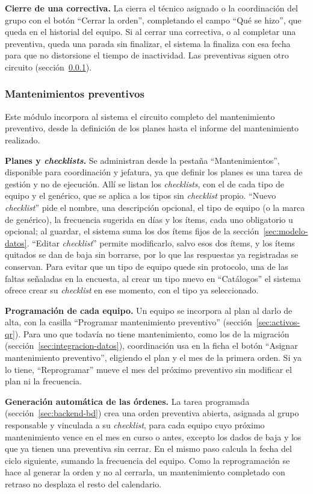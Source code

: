\documentclass[10pt]{article}
\begin{document}
\noindent \textbf{Cierre de una correctiva.} La cierra el técnico asignado o la coordinación del grupo con el botón “Cerrar la orden”, completando el campo “Qué se hizo”, que queda en el historial del equipo.  Si al cerrar una correctiva, o al completar una preventiva, queda una parada sin finalizar, el sistema la finaliza con esa fecha para que no distorsione el tiempo de inactividad. Las preventivas siguen otro circuito (sección~\ref{sec:mantenimiento-preventivo}).
\subsubsection{Mantenimientos preventivos}
\label{sec:mantenimiento-preventivo}
Este módulo incorpora al sistema el circuito completo del mantenimiento preventivo, desde la definición de los planes hasta el informe del mantenimiento realizado.

\textbf{Planes y \textit{checklists}.} Se administran desde la pestaña “Mantenimientos”, disponible para coordinación y jefatura, ya que definir los planes es una tarea de gestión y no de ejecución. Allí se listan los \textit{checklists}, con el de cada tipo de equipo y el genérico, que se aplica a los tipos sin \textit{checklist} propio. “Nuevo \textit{checklist}” pide el nombre, una descripción opcional, el tipo de equipo (o la marca de genérico), la frecuencia sugerida en días y los ítems, cada uno obligatorio u opcional; al guardar, el sistema suma los dos ítems fijos de la sección~\ref{sec:modelo-datos}. “Editar \textit{checklist}” permite modificarlo, salvo esos dos ítems, y los ítems quitados se dan de baja sin borrarse, por lo que las respuestas ya registradas se conservan. Para evitar que un tipo de equipo quede sin protocolo, una de las faltas señaladas en la encuesta, al crear un tipo nuevo en “Catálogos” el sistema ofrece crear su \textit{checklist} en ese momento, con el tipo ya seleccionado.

\textbf{Programación de cada equipo.} Un equipo se incorpora al plan al darlo de alta, con la casilla “Programar mantenimiento preventivo” (sección~\ref{sec:activos-qr}). Para uno que todavía no tiene mantenimiento, como los de la migración (sección~\ref{sec:integracion-datos}), coordinación usa en la ficha el botón “Asignar mantenimiento preventivo”, eligiendo el plan y el mes de la primera orden. Si ya lo tiene, “Reprogramar” mueve el mes del próximo preventivo sin modificar el plan ni la frecuencia.

\textbf{Generación automática de las órdenes.} La tarea programada (sección~\ref{sec:backend-bd}) crea una orden preventiva abierta, asignada al grupo responsable y vinculada a su \textit{checklist}, para cada equipo cuyo próximo mantenimiento vence en el mes en curso o antes, excepto los dados de baja y los que ya tienen una preventiva sin cerrar. En el mismo paso calcula la fecha del ciclo siguiente, sumando la frecuencia del equipo. Como la reprogramación se hace al generar la orden y no al cerrarla, un mantenimiento completado con retraso no desplaza el resto del calendario.
\end{document}
